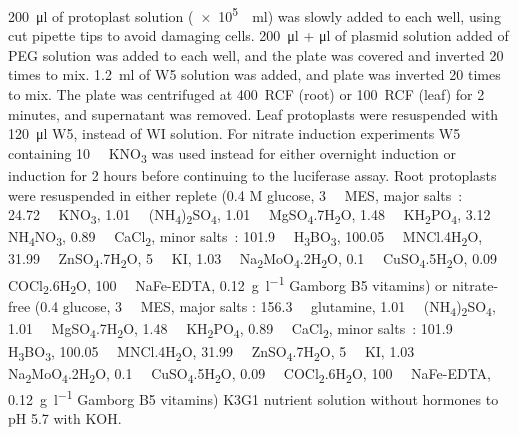 \documentclass[../main.tex]{subfiles}
\begin{document}
\SI{200}{\micro\litre} of protoplast solution (\SI{e5}{\per\ml}) was slowly added to each well, using cut pipette tips to avoid damaging cells.
\SI{200}{\micro\litre} + \si{\micro\litre} of plasmid solution added of PEG solution was added to each well, and the plate was covered and inverted 20 times to mix.
\SI{1.2}{\ml} of W5 solution was added, and plate was inverted 20 times to mix.
The plate was centrifuged at 400~RCF (root) or 100~RCF (leaf) for 2 minutes, and supernatant was removed.
Leaf protoplasts were resuspended with \SI{120}{\micro\litre} W5, instead of WI solution.
For nitrate induction experiments W5 containing \SI{10}{\milli\Molar} KNO\textsubscript{3} was used instead for either overnight induction or induction for 2 hours before continuing to the luciferase assay.
Root protoplasts were resuspended in either replete (0.4 M glucose, \SI{3}{\milli\Molar} MES, major salts~\autocite{nagyCallusInductionPlant1976}: \SI{24.72}{\milli\Molar} KNO\textsubscript{3}, \SI{1.01}{\milli\Molar} (NH\textsubscript{4})\textsubscript{2}SO\textsubscript{4}, \SI{1.01}{\milli\Molar} MgSO\textsubscript{4}.7H\textsubscript{2}O, \SI{1.48}{\milli\Molar} KH\textsubscript{2}PO\textsubscript{4}, \SI{3.12}{\milli\Molar} NH\textsubscript{4}NO\textsubscript{3}, \SI{0.89}{\milli\Molar} CaCl\textsubscript{2}, minor salts~\autocite{gamborgNutrientRequirementsSuspension1968}: \SI{101.9}{\micro\Molar} H\textsubscript{3}BO\textsubscript{3}, \SI{100.05}{\micro\Molar} MNCl.4H\textsubscript{2}O, \SI{31.99}{\micro\Molar} ZnSO\textsubscript{4}.7H\textsubscript{2}O, \SI{5}{\micro\Molar} KI, \SI{1.03}{\micro\Molar} Na\textsubscript{2}MoO\textsubscript{4}.2H\textsubscript{2}O, \SI{0.1}{\micro\Molar} CuSO\textsubscript{4}.5H\textsubscript{2}O, \SI{0.09}{\micro\Molar} COCl\textsubscript{2}.6H\textsubscript{2}O, \SI{100}{\micro\Molar}  NaFe\hyp{}EDTA, \SI{0.12}{\gram\per\l} Gamborg B5 vitamins) or nitrate\hyp{}free (\SI{0.4}{\Molar} glucose, \SI{3}{\milli\Molar} MES, major salts \autocite{nagyCallusInductionPlant1976}: \SI{156.3}{\milli\Molar} glutamine, \SI{1.01}{\milli\Molar} (NH\textsubscript{4})\textsubscript{2}SO\textsubscript{4}, \SI{1.01}{\milli\Molar} MgSO\textsubscript{4}.7H\textsubscript{2}O, \SI{1.48}{\milli\Molar} KH\textsubscript{2}PO\textsubscript{4}, \SI{0.89}{\milli\Molar} CaCl\textsubscript{2}, minor salts~\autocite{gamborgNutrientRequirementsSuspension1968}: \SI{101.9}{\micro\Molar} H\textsubscript{3}BO\textsubscript{3}, \SI{100.05}{\micro\Molar} MNCl.4H\textsubscript{2}O, \SI{31.99}{\micro\Molar} ZnSO\textsubscript{4}.7H\textsubscript{2}O, \SI{5}{\micro\Molar} KI, \SI{1.03}{\micro\Molar} Na\textsubscript{2}MoO\textsubscript{4}.2H\textsubscript{2}O, \SI{0.1}{\micro\Molar} CuSO\textsubscript{4}.5H\textsubscript{2}O, \SI{0.09}{\micro\Molar} COCl\textsubscript{2}.6H\textsubscript{2}O, \SI{100}{\micro\Molar}  NaFe\hyp{}EDTA, \SI{0.12}{\g\per\l} Gamborg B5 vitamins) K3G1 nutrient solution without hormones to pH 5.7 with KOH.
\end{document}
